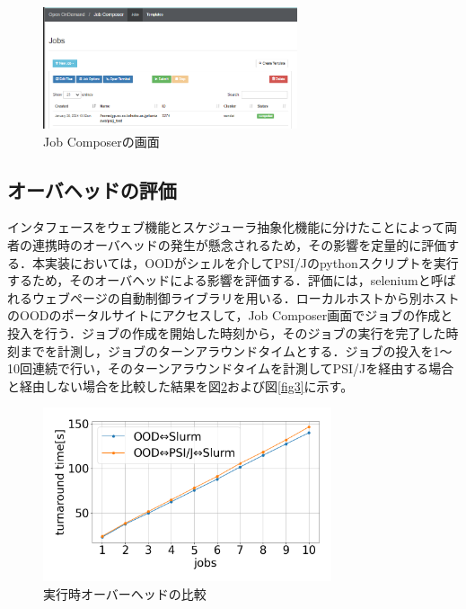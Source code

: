 \documentclass[a4paper,oneside,twocolumn,notitlepage,dvipdfmx]{jsarticle}
\begin{document}
\begin{figure}[tb]
  \centering
  \includegraphics[width=75mm]{./fig/jobcomposer.png}
  \caption{Job Composerの画面}
  \label{fig4}
\end{figure}

\subsection{オーバヘッドの評価}
インタフェースをウェブ機能とスケジューラ抽象化機能に分けたことによって両者の連携時のオーバヘッドの発生が懸念されるため，その影響を定量的に評価する．本実装においては，OODがシェルを介してPSI/Jのpythonスクリプトを実行するため，そのオーバヘッドによる影響を評価する．評価には，seleniumと呼ばれるウェブページの自動制御ライブラリを用いる．ローカルホストから別ホストのOODのポータルサイトにアクセスして，Job Composer画面でジョブの作成と投入を行う．ジョブの作成を開始した時刻から，そのジョブの実行を完了した時刻までを計測し，ジョブのターンアラウンドタイムとする．ジョブの投入を1～10回連続で行い，そのターンアラウンドタイムを計測してPSI/Jを経由する場合と経由しない場合を比較した結果を図\ref{fig2}および図\ref{fig3}に示す。\par

\begin{figure}[h]
  \centering
  \hspace{-11mm}
  \includegraphics[width=85mm]{./fig/ave_1-20.png}
  \vspace{-10pt}
  \caption{実行時オーバーヘッドの比較}
  \label{fig2}
\end{figure}
\end{document}
